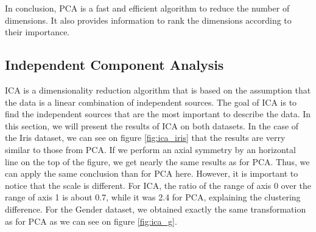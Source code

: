 \documentclass[twocolumn, 10pt]{article}
\begin{document}
			In conclusion, PCA is a fast and efficient algorithm to reduce the number of dimensions. It also provides information to rank the dimensions according to their importance.
		\subsection{Independent Component Analysis}
			ICA is a dimensionality reduction algorithm that is based on the assumption that the data is a linear combination of independent sources. The goal of ICA is to find the independent sources that are the most important to describe the data. In this section, we will present the results of ICA on both datasets. In the case of the Iris dataset, we can see on figure \ref{fig:ica_iris} that the results are verry similar to those from PCA. If we perform an axial symmetry by an horizontal line on the top of the figure, we get nearly the same results as for PCA. Thus, we can apply the same conclusion than for PCA here. However, it is important to notice that the scale is different. For ICA, the ratio of the range of axis 0 over the range of axis 1 is about 0.7, while it was 2.4 for PCA, explaining the clustering difference. For the Gender dataset, we obtained exactly the same transformation as for PCA as we can see on figure \ref{fig:ica_g}.
\end{document}
